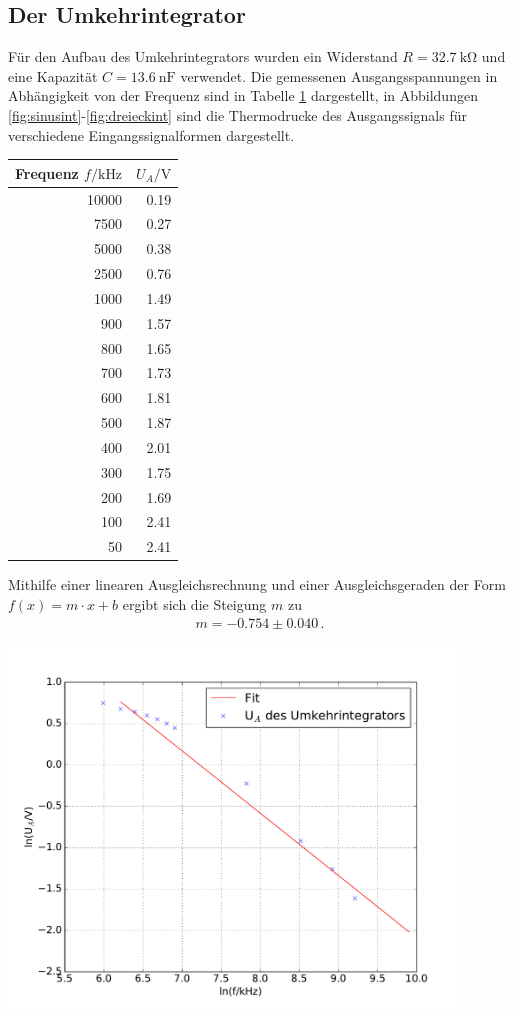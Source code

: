 \documentclass[]{scrartcl}
\begin{document}
\subsection{Der Umkehrintegrator}
Für den Aufbau des Umkehrintegrators wurden ein Widerstand $R=\SI{32.7}{\kilo\ohm}$ und eine Kapazität $C=\SI{13.6}{\nano\farad}$ verwendet. Die gemessenen Ausgangsspannungen in Abhängigkeit von der Frequenz sind in Tabelle \ref{tab:integrator} dargestellt, in Abbildungen \ref{fig:sinusint}-\ref{fig:dreieckint} sind die Thermodrucke des Ausgangssignals für verschiedene Eingangssignalformen dargestellt.
\begin{table}[H]
	\label{tab:integrator}
	\hskip-1.50cm
	\begin{tabular}{r r}
		\toprule
			Frequenz $f / \si{\kilo\hertz}$ & $U_A / \si{\volt}$ \\
		\midrule
			10000 & 0.19 \\
			7500  & 0.27 \\
			5000  & 0.38 \\
			2500  & 0.76 \\
			1000  & 1.49 \\
			900   & 1.57 \\
			800   & 1.65 \\
			700   & 1.73 \\
			600   & 1.81 \\
			500   & 1.87 \\
			400   & 2.01 \\
			300   & 1.75 \\
			200   & 1.69 \\
			100   & 2.41 \\
			50    & 2.41 \\
		 \bottomrule
	\end{tabular}
\end{table}
Mithilfe einer linearen Ausgleichsrechnung und einer Ausgleichsgeraden der Form $f(x)=m\cdot x +b$ ergibt sich die Steigung $m$ zu
\begin{align*}
m = -0.754\pm 0.040\,.
\end{align*}
\begin{center}
	\includegraphics[width=12cm]{images/integrator.pdf}
	\label{fig:integrator}
\end{center}
\end{document}
